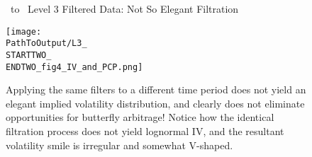 \begin{figure}[H] %
  \centering
  \caption{\STARTTWO\ to \ENDTWO\ Level 3 Filtered Data: Not So Elegant Filtration}
  \texttt{[image: \\PathToOutput/L3\_\\STARTTWO\_\\ENDTWO\_fig4\_IV\_and\_PCP.png]}
  \caption*{Applying the same filters to a different time period does not yield an elegant implied volatility distribution, and clearly does not eliminate opportunities for butterfly arbitrage! Notice how the identical filtration process does not yield lognormal IV, and the resultant volatility smile is irregular and somewhat V-shaped.}
  \label{fig:time2lvl3fig4}
\end{figure}



\newpage

% 


\newpage

